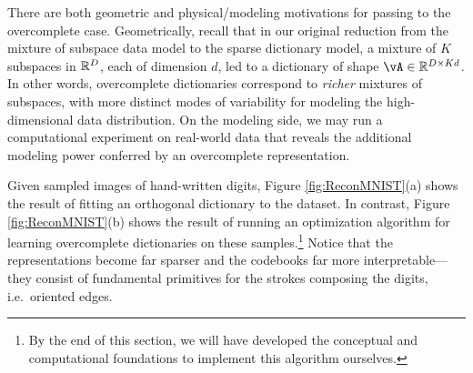 \documentclass[../../book-main.tex]{subfiles}
\begin{document}
There are both geometric and physical/modeling motivations for passing to the overcomplete case. 
Geometrically, recall that in our original reduction from the mixture of subspace data model to the sparse dictionary model, a mixture of $K$ subspaces in $\mathbb{R}^D$, each of dimension $d$, led to a dictionary of shape $\vA \in \R^{D \times Kd}$.
In other words, overcomplete dictionaries correspond to \textit{richer} mixtures of subspaces, with more distinct modes of variability for modeling the high-dimensional data distribution.
On the modeling side, we may run a computational experiment on real-world data that reveals the additional modeling power conferred by an overcomplete representation.
\begin{example}
Given sampled images of hand-written digits, Figure \ref{fig:ReconMNIST}(a) shows the result of fitting an orthogonal dictionary to the dataset. 
In contrast, Figure \ref{fig:ReconMNIST}(b) shows the result of running an
    optimization algorithm for learning overcomplete dictionaries on these samples.\footnote{By the end of this section, we will have developed the conceptual and computational foundations to implement this algorithm ourselves.} 
Notice that the representations become far sparser and the codebooks far more interpretable---they consist of fundamental primitives for the strokes composing the digits, i.e.\ oriented edges.
\end{example}
\end{document}

